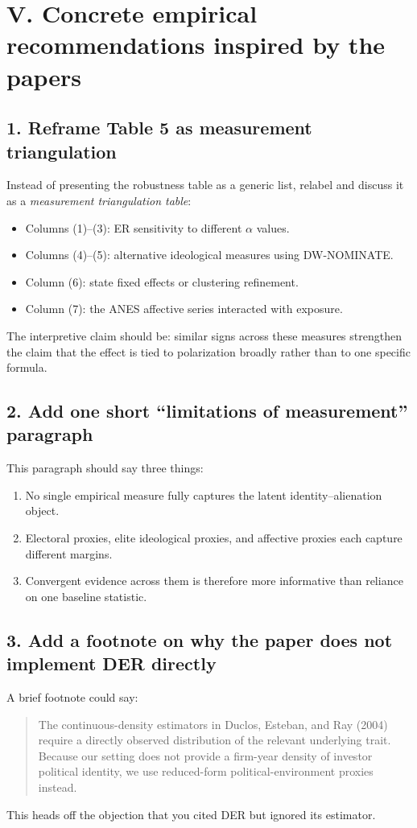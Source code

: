\documentclass[12pt]{article}
\begin{document}
\section*{V. Concrete empirical recommendations inspired by the papers}

\subsection*{1. Reframe Table 5 as measurement triangulation}
Instead of presenting the robustness table as a generic list, relabel and discuss it as a \emph{measurement triangulation table}:
\begin{itemize}
    \item Columns (1)--(3): ER sensitivity to different $\alpha$ values.
    \item Columns (4)--(5): alternative ideological measures using DW-NOMINATE.
    \item Column (6): state fixed effects or clustering refinement.
    \item Column (7): the ANES affective series interacted with exposure.
\end{itemize}
The interpretive claim should be: similar signs across these measures strengthen the claim that the effect is tied to polarization broadly rather than to one specific formula.

\subsection*{2. Add one short ``limitations of measurement'' paragraph}
This paragraph should say three things:
\begin{enumerate}[label=\arabic*.]
    \item No single empirical measure fully captures the latent identity--alienation object.
    \item Electoral proxies, elite ideological proxies, and affective proxies each capture different margins.
    \item Convergent evidence across them is therefore more informative than reliance on one baseline statistic.
\end{enumerate}

\subsection*{3. Add a footnote on why the paper does not implement DER directly}
A brief footnote could say:
\begin{quote}
The continuous-density estimators in Duclos, Esteban, and Ray (2004) require a directly observed distribution of the relevant underlying trait. Because our setting does not provide a firm-year density of investor political identity, we use reduced-form political-environment proxies instead.
\end{quote}
This heads off the objection that you cited DER but ignored its estimator.
\end{document}
